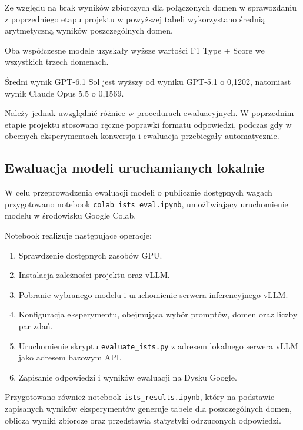 \documentclass[a4paper,10pt]{article}
\begin{document}
Ze względu na brak wyników zbiorczych dla połączonych
domen w sprawozdaniu z poprzedniego etapu projektu
w powyższej tabeli wykorzystano średnią arytmetyczną
wyników poszczególnych domen.

Oba współczesne modele uzyskały wyższe wartości
F1 Type + Score we wszystkich trzech domenach.

Średni wynik GPT-6.1 Sol jest wyższy od wyniku GPT-5.1
o 0,1202, natomiast wynik Claude Opus 5.5 o 0,1569.

Należy jednak uwzględnić różnice w procedurach
ewaluacyjnych. W poprzednim etapie projektu stosowano
ręczne poprawki formatu odpowiedzi, podczas gdy
w obecnych eksperymentach konwersja i ewaluacja
przebiegały automatycznie.


\subsection{Ewaluacja modeli uruchamianych lokalnie}

W celu przeprowadzenia ewaluacji modeli o publicznie
dostępnych wagach przygotowano notebook
\texttt{colab\_ists\_eval.ipynb}, umożliwiający
uruchomienie modelu w środowisku Google Colab.

Notebook realizuje następujące operacje:

\begin{enumerate}
    \item Sprawdzenie dostępnych zasobów GPU.

    \item Instalacja zależności projektu oraz vLLM.

    \item Pobranie wybranego modelu i uruchomienie
    serwera inferencyjnego vLLM.

    \item Konfiguracja eksperymentu, obejmująca wybór
    promptów, domen oraz liczby par zdań.

    \item Uruchomienie skryptu
    \texttt{evaluate\_ists.py} z adresem lokalnego
    serwera vLLM jako adresem bazowym API.

    \item Zapisanie odpowiedzi i wyników ewaluacji
    na Dysku Google.
\end{enumerate}

Przygotowano również notebook
\texttt{ists\_results.ipynb}, który na podstawie
zapisanych wyników eksperymentów generuje tabele
dla poszczególnych domen, oblicza wyniki zbiorcze
oraz przedstawia statystyki odrzuconych odpowiedzi.
\end{document}

